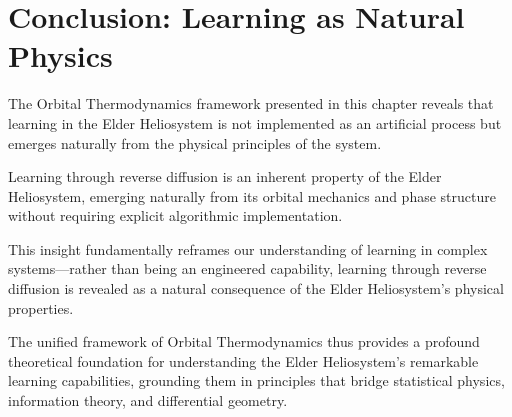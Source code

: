\section{Conclusion: Learning as Natural Physics}

The Orbital Thermodynamics framework presented in this chapter reveals that learning in the Elder Heliosystem is not implemented as an artificial process but emerges naturally from the physical principles of the system.

\begin{theorem}
Learning through reverse diffusion is an inherent property of the Elder Heliosystem, emerging naturally from its orbital mechanics and phase structure without requiring explicit algorithmic implementation.
\end{theorem}

This insight fundamentally reframes our understanding of learning in complex systems—rather than being an engineered capability, learning through reverse diffusion is revealed as a natural consequence of the Elder Heliosystem's physical properties.

The unified framework of Orbital Thermodynamics thus provides a profound theoretical foundation for understanding the Elder Heliosystem's remarkable learning capabilities, grounding them in principles that bridge statistical physics, information theory, and differential geometry.